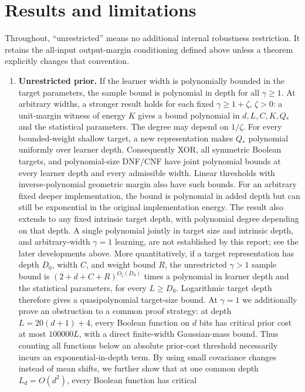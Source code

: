 \documentclass[11pt]{article}
\begin{document}
\section{Results and limitations}

Throughout, ``unrestricted'' means no additional internal robustness
restriction. It retains the all-input output-margin conditioning defined above
unless a theorem explicitly changes that convention.

\begin{enumerate}
\item \textbf{Unrestricted prior.}
If the learner width is polynomially bounded in the target parameters,
the sample bound is polynomial in depth for all $\gamma\ge1$.
At arbitrary widths, a stronger result holds for each fixed
$\gamma\ge1+\zeta$, $\zeta>0$: a unit-margin witness of energy $K$
gives a bound polynomial in $d,L,C,K,Q_*$ and the statistical parameters.
The degree may depend on $1/\zeta$. For every bounded-weight shallow
target, a new representation makes $Q_*$ polynomial uniformly over
learner depth. Consequently XOR, all symmetric Boolean targets, and
polynomial-size DNF/CNF have joint polynomial bounds at every learner
depth and every admissible width. Linear thresholds with
inverse-polynomial geometric margin also have such bounds. For an
arbitrary fixed deeper implementation, the bound is polynomial in added
depth but can still be exponential in the original implementation energy.
The result also extends to any fixed intrinsic target depth, with polynomial
degree depending on that depth. A single polynomial jointly in target
size and intrinsic depth, and arbitrary-width $\gamma=1$ learning,
are not established by this report; see the later developments above.
More quantitatively, if a target representation has depth $D_0$, width $C$,
and weight bound $R$, the unrestricted $\gamma>1$ sample bound is
$(2+d+C+R)^{O_\zeta(D_0)}$ times a polynomial in learner depth and the
statistical parameters, for every $L\ge D_0$. Logarithmic target depth
therefore gives a quasipolynomial target-size bound.
At $\gamma=1$ we additionally prove an obstruction to a common proof
strategy: at depth $L=20(d+1)+4$, every Boolean function on $d$ bits has
critical prior cost at most $100000L$, with a direct finite-width
Gaussian-mass bound. Thus counting all functions below an absolute
prior-cost threshold necessarily incurs an exponential-in-depth term.
By using small covariance changes instead of mean shifts, we further show
that at one common depth $L_d=O(d^2)$, every Boolean function has critical

\end{enumerate}
\end{document}
